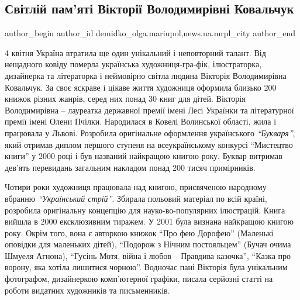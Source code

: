  
 
 
 
 
 
\subsection{Світлій пам'яті Вікторії Володимирівні Ковальчук}
\label{sec:15_04_2021.stz.news.ua.mrpl_city.1.viktoria_kovalchuk}
 
\ifcmt
 author_begin
   author_id demidko_olga.mariupol,news.ua.mrpl_city
 author_end
\fi


4 квітня Україна втратила ще один унікальний і неповторний талант. Від
нещадного ковіду померла українська художниця-гра\hyp{}фік, ілюстраторка, дизайнерка
та літераторка і неймовірно світла людина Вікторія Володимирівна Ковальчук. За
своє яскраве і цікаве життя художниця оформила близько 200 книжок різних
жанрів, серед них понад 30 книг для дітей. Вікторія Володимирівна – лауреатка
державної премії імені Лесі Українки та літературної премії імені Олени Пчілки.
Народилася в Ковелі Волинської області, жила і працювала у Львові. Розробила
оригінальне оформлення українського \emph{\enquote{Букваря}}, який отримав диплом першого
ступеня на всеукраїнському конкурсі \enquote{Мистецтво книги} у 2000 році і був
названий найкращою книгою року. Буквар витримав дев'ять перевидань загальним
накладом понад 200 тисяч примірників.

Чотири роки художниця працювала над книгою, присвяченою народному вбранню
\emph{\enquote{Український стрій}}. Збирала польовий матеріал по всій країні, розробила
оригінальну концепцію для науко\hyp{}во-популярних ілюстрацій. Книга вийшла в 2000
ексклюзивним тиражем. У 2001 була визнана найкращою книгою року. Окрім того,
вона є авторкою книжок \enquote{Про фею Дорофею} (Маленькі оповідки для маленьких
дітей), \enquote{Подорож з Нічним постояльцем} (Бучач очима Шмуеля Агнона), \enquote{Гусінь
Мотя, війна і любов – Правдива казочка}, \enquote{Казка про ворону, яка хотіла лишитися
чорною}. Водночас пані Вікторія була унікальним фотографом, дизайнеркою
комп'ютерної графіки, писала серйозні статті на роботи видатних художників та
письменників.

